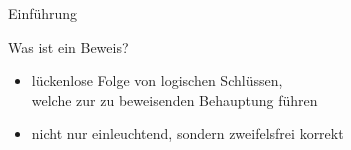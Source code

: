 %
%
%
%

\begin{frame}{Einführung}
    \begin{alertblock}{Was ist ein Beweis?}
        \begin{itemize}
            \item lückenlose Folge von logischen Schlüssen,\\welche zur zu beweisenden Behauptung führen
            \item nicht nur einleuchtend, sondern zweifelsfrei korrekt
        \end{itemize}
    \end{alertblock}
\end{frame}

